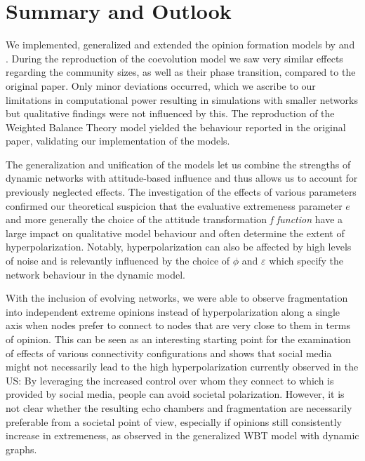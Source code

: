 \documentclass[11pt]{article}
\begin{document}
 \clearpage
\section{Summary and Outlook} \label{sumandout}
We implemented, generalized and extended the opinion formation models by \citet{holme2006nonequilibrium} and \citet{schweighofer2020}.
During the reproduction of the coevolution model we saw very similar effects regarding the community sizes, as well as their phase transition, compared to the original paper.
Only minor deviations occurred, which we ascribe to our limitations in computational power resulting in simulations with smaller networks but qualitative findings were not influenced by this.
The reproduction of the Weighted Balance Theory model yielded the behaviour reported in the original paper, validating our implementation of the models.

The generalization and unification of the models let us combine the strengths of dynamic networks with attitude-based influence and thus allows us to account for previously neglected effects. 
The investigation of the effects of various parameters confirmed our theoretical suspicion that the evaluative extremeness parameter $e$ and more generally the choice of the attitude transformation \textit{f function} have a large impact on qualitative model behaviour and often determine the extent of hyperpolarization. Notably, hyperpolarization can also be affected by high levels of noise and is relevantly influenced by the choice of $\phi$ and $\varepsilon$ which specify the network behaviour in the dynamic model. 

With the inclusion of evolving networks, we were able to observe fragmentation into independent extreme opinions instead of hyperpolarization along a single axis when nodes prefer to connect to nodes that are very close to them in terms of opinion. This can be seen as an interesting starting point for the examination of effects of various connectivity configurations and shows that social media might not necessarily lead to the high hyperpolarization currently observed in the US: By leveraging the increased control over whom they connect to which is provided by social media, people can avoid societal polarization. However, it is not clear whether the resulting echo chambers and fragmentation are necessarily preferable from a societal point of view, especially if opinions still consistently increase in extremeness, as observed in the generalized WBT model with dynamic graphs. 
\end{document}
